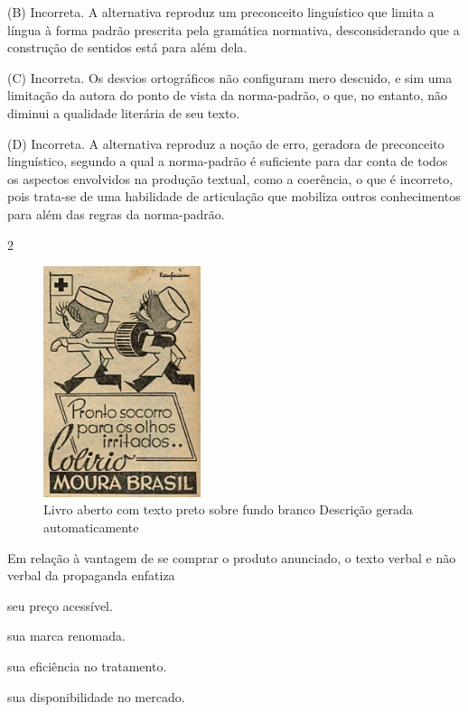 (B) Incorreta. A alternativa reproduz um preconceito linguístico que
limita a língua à forma padrão prescrita pela gramática normativa,
desconsiderando que a construção de sentidos está para além dela.

(C) Incorreta. Os desvios ortográficos não configuram mero descuido, e
sim uma limitação da autora do ponto de vista da norma-padrão, o que, no
entanto, não diminui a qualidade literária de seu texto.

(D) Incorreta. A alternativa reproduz a noção de erro, geradora de
preconceito linguístico, segundo a qual a norma-padrão é suficiente para
dar conta de todos os aspectos envolvidos na produção textual, como a
coerência, o que é incorreto, pois trata-se de uma habilidade de
articulação que mobiliza outros conhecimentos para além das regras da
norma-padrão.

\num{2}

\begin{figure}
\centering
\includegraphics[width=1.81474in,height=2.66429in]{./imgSAEB_8_POR/media/image35.png}
\caption{Livro aberto com texto preto sobre fundo branco Descrição
gerada automaticamente}
\end{figure}


Em relação à vantagem de se comprar o produto anunciado, o texto verbal
e não verbal da propaganda enfatiza

\begin{escolha}
\item seu preço acessível.

\item sua marca renomada.

\item sua eficiência no tratamento.

\item sua disponibilidade no mercado.
\end{escolha}

